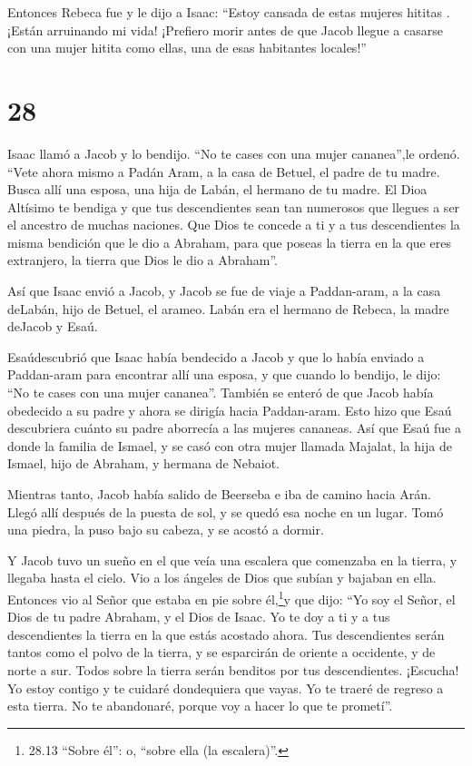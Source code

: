  Entonces Rebeca fue y le dijo a Isaac: ``Estoy cansada de
estas mujeres hititas . ¡Están arruinando mi vida! ¡Prefiero morir antes
de que Jacob llegue a casarse con una mujer hitita como ellas, una de
esas habitantes locales!''

\hypertarget{section-27}{%
\section{28}\label{section-27}}

 Isaac llamó a Jacob y lo bendijo. ``No te cases con una
mujer cananea'',le ordenó.  ``Vete ahora mismo a Padán Aram,
a la casa de Betuel, el padre de tu madre. Busca allí una esposa, una
hija de Labán, el hermano de tu madre.  El Dioa Altísimo te
bendiga y que tus descendientes sean tan numerosos que llegues a ser el
ancestro de muchas naciones.  Que Dios te concede a ti y a
tus descendientes la misma bendición que le dio a Abraham, para que
poseas la tierra en la que eres extranjero, la tierra que Dios le dio a
Abraham''.

 Así que Isaac envió a Jacob, y Jacob se fue de viaje a
Paddan-aram, a la casa deLabán, hijo de Betuel, el arameo. Labán era el
hermano de Rebeca, la madre deJacob y Esaú.

 Esaúdescubrió que Isaac había bendecido a Jacob y que lo
había enviado a Paddan-aram para encontrar allí una esposa, y que cuando
lo bendijo, le dijo: ``No te cases con una mujer cananea''. 
También se enteró de que Jacob había obedecido a su padre y ahora se
dirigía hacia Paddan-aram.  Esto hizo que Esaú descubriera
cuánto su padre aborrecía a las mujeres cananeas.  Así que
Esaú fue a donde la familia de Ismael, y se casó con otra mujer llamada
Majalat, la hija de Ismael, hijo de Abraham, y hermana de Nebaiot.

 Mientras tanto, Jacob había salido de Beerseba e iba de
camino hacia Arán.  Llegó allí después de la puesta de sol,
y se quedó esa noche en un lugar. Tomó una piedra, la puso bajo su
cabeza, y se acostó a dormir.

 Y Jacob tuvo un sueño en el que veía una escalera que
comenzaba en la tierra, y llegaba hasta el cielo. Vio a los ángeles de
Dios que subían y bajaban en ella.  Entonces vio al Señor
que estaba en pie sobre él,\footnote{28.13 ``Sobre él'': o, ``sobre ella
  (la escalera)''.}y que dijo: ``Yo soy el Señor, el Dios de tu padre
Abraham, y el Dios de Isaac. Yo te doy a ti y a tus descendientes la
tierra en la que estás acostado ahora.  Tus descendientes
serán tantos como el polvo de la tierra, y se esparcirán de oriente a
occidente, y de norte a sur. Todos sobre la tierra serán benditos por
tus descendientes.  ¡Escucha! Yo estoy contigo y te cuidaré
dondequiera que vayas. Yo te traeré de regreso a esta tierra. No te
abandonaré, porque voy a hacer lo que te prometí''.

